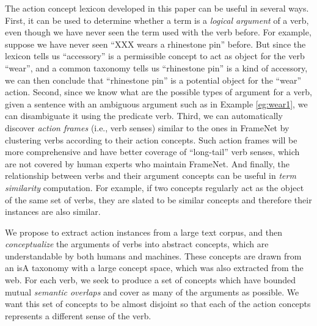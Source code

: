 The action concept lexicon developed in this paper can be useful
in several ways.
First, it can be used to determine whether a term is
a {\em logical argument} of a verb, even though we have never
seen the term used with the verb before.
For example, suppose we have never seen ``XXX wears
a rhinestone pin'' before. But since the lexicon tells us
``accessory'' is a permissible concept to act as object for the verb ``wear'',
and a common taxonomy tells us ``rhinestone pin''
is a kind of accessory, we can then conclude that
``rhinestone pin'' is a potential object for the ``wear'' action.
Second, since we know what are the possible types of
argument for a verb, given a sentence with an ambiguous argument
such as in Example \ref{eg:wear1},
we can disambiguate it using the predicate verb.
Third, we can automatically discover {\em action frames}
(i.e., verb senses) similar to the ones in FrameNet by
clustering verbs according to their action concepts.
Such action frames will be more
comprehensive and have
better coverage of ``long-tail'' verb senses, which are
not covered by human experts who maintain FrameNet.
And finally, the relationship between verbs and their
argument concepts can be
useful in {\em term similarity} computation.
For example, if two concepts regularly act as the
object of the same set of verbs, they are slated to
be similar concepts and therefore their instances are
also similar.

We propose to extract action instances from a large text corpus,
and then {\em conceptualize} the arguments of verbs into
abstract concepts, which are understandable by both humans and
machines. These concepts are drawn from an isA taxonomy with
a large concept space, which was also extracted from the web.
For each verb,
we seek to produce a set of concepts which have bounded
mutual {\em semantic overlaps} and cover as many of the
arguments as possible.
We want this set of concepts to be almost disjoint so
that each of the action concepts represents a different sense
of the verb.


